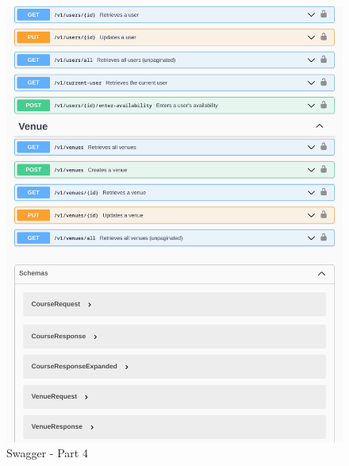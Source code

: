 \begin{justify}
        \begin{figure}[H]
            \begin{minipage}[trim]{1\textwidth}
            \centerline{\includegraphics[width=150mm,scale=1]{figures/implementation_and_testing/implementation/backend/swagger-4.pdf}}
            \caption{Swagger - Part 4}
            \end{minipage}
        \end{figure}
        

\end{justify}
